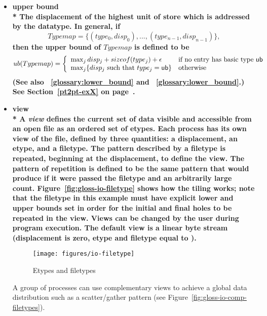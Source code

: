 \begin{itemize}
\label{glossary:upper_bound}
\item \bf{ upper bound} \\*
The displacement of the highest unit of store which is addressed by the datatype. 
In general, if
\begin{displaymath}
Typemap = \{ (type_0 , disp_0 ) , ... , (type_{n-1} , disp_{n-1}) \} ,
\end{displaymath}
then the {\bf upper bound} of $Typemap$ is defined to be
\[
ub(Typemap) = \left\{ \begin{array}{ll}
\max_j disp_j + sizeof(type_j) + \epsilon & \mbox{if no entry has basic type
{\sf ub}}
\\ \max_j \{ disp_j \ \mbox{such that}\ type_j = {\sf ub} \} & \mbox{otherwise}
\end{array}
\right. \]
(See also ~\ref{glossary:lower_bound} and ~\ref{glossary:lower_bound}.)
See Section~\ref{pt2pt-exX} on page~\pageref{pt2pt-exX}.

\label{glossary:view}
\item \bf{ view} \\*
A {\it view} defines the current set of data visible
and accessible from an open file as an ordered set of etypes.
Each process has its own view of the file,
defined by three quantities:
a displacement, an etype, and a filetype.
The pattern described by a filetype is repeated,
beginning at the displacement, to define the view.
The pattern of repetition is defined to be the same pattern
that  would produce if it were passed
the filetype and an arbitrarily large count.
Figure~\ref{fig:gloss-io-filetype} shows how the tiling works; note 
that the filetype in this example must have explicit 
lower and upper bounds set in order for the initial and final holes to be
repeated in the view.
Views can be changed by the user during program execution.
The default view is a linear byte stream
(displacement is zero, etype and filetype equal to ).

\begin{figure}[htpb]
  \centerline{\texttt{[image: figures/io-filetype]}}
  \caption{Etypes and filetypes}
  \label{fig:glossary-io-filetype}
\end{figure}

A group of processes can use complementary views to
achieve a global data distribution such as a scatter/gather pattern
(see Figure~\ref{fig:gloss-io-comp-filetypes}).


\end{itemize}
